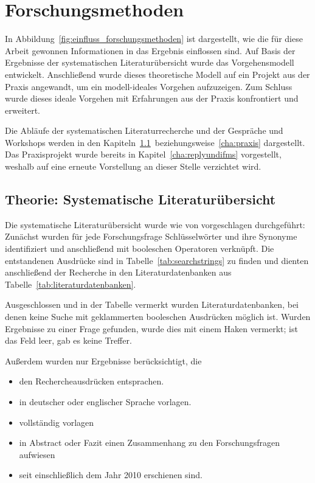 \section{Forschungsmethoden}
\label{cha:method}
In Abbildung~\ref{fig:einfluss_forschungsmethoden} ist dargestellt, wie die für diese Arbeit gewonnen Informationen in das Ergebnis einflossen sind. Auf Basis der 
Ergebnisse der systematischen Literaturübersicht wurde das Vorgehensmodell 
entwickelt. Anschließend wurde dieses theoretische Modell auf ein Projekt aus 
der Praxis angewandt, um ein modell-ideales Vorgehen aufzuzeigen. Zum Schluss 
wurde dieses ideale Vorgehen mit Erfahrungen aus der Praxis konfrontiert und 
erweitert.

Die Abläufe der systematischen Literaturrecherche und der Gespräche und 
Workshops werden in den 
Kapiteln~\ref{cha:literaturuebersicht}~beziehungsweise~\ref{cha:praxis} 
dargestellt. Das Praxisprojekt wurde bereits in Kapitel~\ref{cha:replyundifms} 
vorgestellt, weshalb auf eine erneute Vorstellung an dieser Stelle verzichtet 
wird.
\subsection{Theorie: Systematische Literaturübersicht}
\label{cha:literaturuebersicht}
Die systematische Literaturübersicht wurde wie von  
vorgeschlagen durchgeführt: Zunächst wurden für jede Forschungsfrage 
Schlüsselwörter und ihre Synonyme identifiziert und anschließend mit booleschen 
Operatoren verknüpft. Die entstandenen Ausdrücke sind in 
Tabelle~\ref{tab:searchstrings} zu finden und dienten anschließend der 
Recherche in den Literaturdatenbanken aus Tabelle~\ref{tab:literaturdatenbanken}.


Ausgeschlossen und in der Tabelle vermerkt wurden Literaturdatenbanken, bei 
denen keine Suche mit geklammerten booleschen Ausdrücken möglich ist. Wurden 
Ergebnisse zu einer Frage gefunden, wurde dies mit einem Haken vermerkt; ist 
das Feld leer, gab es keine Treffer.



Außerdem wurden nur Ergebnisse berücksichtigt, die
\begin{itemize}
	\item den Rechercheausdrücken entsprachen.
	\item in deutscher oder englischer Sprache vorlagen.
	\item vollständig vorlagen
	\item in Abstract oder Fazit einen Zusammenhang zu den Forschungsfragen
aufwiesen
	\item seit einschließlich dem Jahr 2010 erschienen sind.
\end{itemize}
\begin{comment}
In diesem Kapitel erläutern Sie ihre Forschungsmethode unter Verwendung von
entsprechenden Quellen.
Begründen Sie auch, warum Sie sich für diese Forschungsmethode entschieden
haben
und warum sie geeignet ist, die vorliegende Forschungsfrage zu beantworten.
\end{comment}


